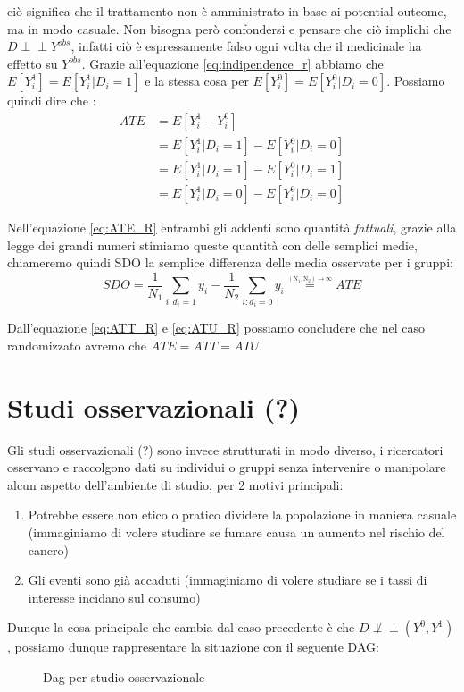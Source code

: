 ciò significa che il trattamento non è amministrato in base ai potential outcome, ma in modo casuale. Non bisogna però confondersi e pensare che ciò implichi che $D \perp\!\!\!\perp Y^{obs}$, infatti ciò è espressamente falso ogni volta che il medicinale ha effetto su $Y^{obs}$.
Grazie all'equazione \ref{eq:indipendence_r} abbiamo che $E[Y^1_i] = E[Y^{1}_i | D_i = 1]  $ e la stessa cosa per $E[Y^0_i] = E[Y^{0}_i | D_i = 0] $.
Possiamo quindi dire che :
\begin{align}
ATE &= E[Y^1_i-Y^0_i ] \\ 
 &= E[Y^{1}_i | D_i = 1]- E[Y^{0}_i | D_i = 0]\label{eq:ATE_R} \\
	& =E[Y^{1}_i | D_i = 1]- E[Y^{0}_i | D_i = 1] \label{eq:ATT_R} \\
 &= E[Y^{1}_i | D_i = 0]- E[Y^{0}_i | D_i = 0] \label{eq:ATU_R}
  \end{align}

Nell'equazione \ref{eq:ATE_R} entrambi gli addenti sono quantità \textit{fattuali}, grazie alla legge dei grandi numeri stimiamo queste quantità con delle semplici medie, chiameremo quindi SDO la semplice differenza delle media osservate per i gruppi:
$$SDO = \frac{1}{N_1}\sum_{i:d_i=1}y_i - \frac{1}{N_2}\sum_{i:d_i=0}y_i \overset{\underset{\mathrm{(N_1, N_2) \rightarrow \infty}}{}}{=} ATE$$

Dall'equazione \ref{eq:ATT_R} e \ref{eq:ATU_R} possiamo concludere che nel caso randomizzato avremo che $ATE = ATT = ATU$.


\section{Studi osservazionali (?)} %
Gli studi osservazionali (?) sono invece strutturati in modo diverso, i ricercatori osservano e raccolgono dati su individui o gruppi senza intervenire o manipolare alcun aspetto dell'ambiente di studio, per 2 motivi principali:
\begin{enumerate}
\item Potrebbe essere non etico o pratico dividere la popolazione in maniera casuale (immaginiamo di volere studiare se fumare causa un aumento nel rischio del cancro)
\item Gli eventi sono già accaduti (immaginiamo di volere studiare se i tassi di interesse incidano sul consumo)
\end{enumerate}

Dunque la cosa principale che cambia dal caso precedente è che $D \not \perp\!\!\!\perp (Y^{0},Y^{1})$, possiamo dunque rappresentare la situazione con il seguente DAG:
\begin{figure}[!h]
\centering
\caption{Dag per studio osservazionale}
\label{fig:dag_OBS}
\end{figure}